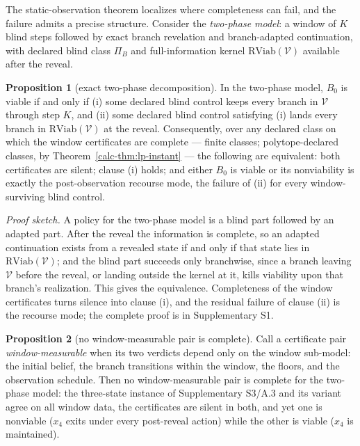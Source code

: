 \documentclass[10pt,twocolumn]{article}
\theoremstyle{definition}
\newtheorem{proposition}{Proposition}
\begin{document}
\medskip
The static-observation theorem localizes where completeness can fail, and the failure
admits a precise structure. Consider the \emph{two-phase model}: a window of \(K\) blind
steps followed by exact branch revelation and branch-adapted continuation, with declared
blind class \(\Pi_{B}\) and full-information kernel \(\mathrm{RViab}(\mathcal{V})\)
available after the reveal.

\begin{proposition}[exact two-phase decomposition]\label{calc-prop:decomposition}
In the two-phase model, \(B_{0}\) is viable if and only if (i) some declared blind control
keeps every branch in \(\mathcal{V}\) through step \(K\), and (ii) some declared blind
control satisfying (i) lands every branch in \(\mathrm{RViab}(\mathcal{V})\) at the reveal.
Consequently, over any declared class on which the window certificates are complete ---
finite classes; polytope-declared classes, by Theorem~\ref{calc-thm:lp-instant} --- the following
are equivalent: both certificates are silent; clause (i) holds; and either \(B_{0}\) is
viable or its nonviability is exactly the post-observation recourse mode, the failure of
(ii) for every window-surviving blind control.
\end{proposition}

\emph{Proof sketch.} A policy for the two-phase model is a blind part followed by an
adapted part. After the reveal the information is complete, so an adapted continuation
exists from a revealed state if and only if that state lies in
\(\mathrm{RViab}(\mathcal{V})\); and the blind part succeeds only branchwise, since a branch
leaving \(\mathcal{V}\) before the reveal, or landing outside the kernel at it, kills
viability upon that branch's realization. This gives the equivalence. Completeness of the
window certificates turns silence into clause (i), and the residual failure of
clause (ii) is the recourse mode; the complete proof is in Supplementary S1.

\begin{proposition}[no window-measurable pair is complete]\label{calc-prop:window-nogo}
Call a certificate pair \emph{window-measurable} when its two verdicts depend only on the
window sub-model: the initial belief, the branch transitions within the window, the floors,
and the observation schedule. Then no window-measurable pair is complete for the two-phase
model: the three-state instance of Supplementary S3/A.3 and its variant agree on all window
data, the certificates are silent in both, and yet one is nonviable (\(x_{4}\) exits under
every post-reveal action) while the other is viable (\(x_{4}\) is maintained).
\end{proposition}
\end{document}

